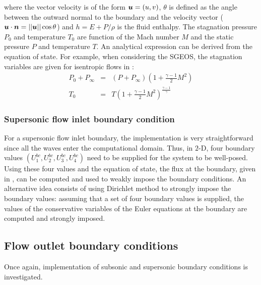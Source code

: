 %    
where the vector velocity is of the form $\boldsymbol u = \left( u,v \right)$, $\theta$ is defined as the angle between the outward normal to the boundary and the velocity vector ($\boldsymbol u \cdot \boldsymbol n = || \boldsymbol u || \cos \theta$) and $h = E + P / \rho$ is the fluid enthalpy. The stagnation pressure $P_0$ and temperature $T_0$ are function of the Mach number $M$ and the static pressure $P$ and temperature $T$. An analytical expression can be derived from the equation of state. For example, when considering the SGEOS, the stagnation variables are given for isentropic flows in  \cite{SEM}:
\begin{eqnarray}\label{eq:stag_bc_sct3}
P_0 + P_\infty &=& \left( P + P_\infty \right) \left( 1 + \frac{\gamma-1}{2}M^2 \right)\\
T_0 &=& T \left( 1 + \frac{\gamma-1}{2}M^2 \right)^{\frac{\gamma-1}{\gamma}}
\end{eqnarray}   
\subsubsection{Supersonic flow inlet boundary condition} \label{sec:sup-flow-inlet-bc}
For a supersonic flow inlet boundary, the implementation is very straightforward since all the waves enter the computational domain. Thus, in $2$-D, four boundary values $\left(U_1^{bc}, U_2^{bc}, U_3^{bc}, U_4^{bc}\right)$ need to be supplied for the system to be well-posed. Using these four values and the equation of state, the flux at the boundary, given in , can be computed and used to weakly impose the boundary conditions. An alternative idea consists of using Dirichlet method to strongly impose the boundary values: assuming that a set of four boundary values is supplied, the values of the conservative variables of the Euler equations at the boundary are computed and strongly imposed. 
\subsection{Flow outlet boundary conditions} \label{sec:flow-outlet-bc}
Once again, implementation of subsonic and supersonic boundary conditions is investigated.
